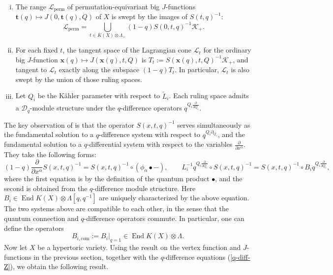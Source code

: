 \documentclass[10pt]{amsart}
\theoremstyle{definition}
\newcommand{\bt}{\mathbf{t}}
\newcommand{\bx}{\mathbf{x}}
\newcommand{\cD}{\mathcal{D}}
\newcommand{\cK}{\mathcal{K}}
\newcommand{\cL}{\mathcal{L}}
\newcommand{\End}{\operatorname{End}}
\newcommand{\com}{\mathrm{com}}
\theoremstyle{definition}
\numberwithin{equation}{section}
\theoremstyle{Theorem}
\begin{document}
\begin{enumerate}[(i)]
	
\setlength{\parskip}{1ex}
	
\item The range $\cL_{\mathrm{perm}}$ of permutation-equivariant big $J$-functions $\bt(q) \mapsto J(0, \bt (q), Q)$ of $X$ is swept by the images of $S(t,q)^{-1}$:
$$
\cL_{\mathrm{perm}} = \bigcup_{t \in K(X) \otimes \Lambda_+} (1-q) S(0, t, q)^{-1} \cK_+.
$$

\item For each fixed $t$, the tangent space of the Lagrangian cone $\cL_t$ for the ordinary big $J$-function $\bx (q) \mapsto J (\bx (q), t, Q)$ is $T_t := S(\bx (q), t, Q)^{-1} \cK_+$, and tangent to $\cL_t$ exactly along the subspace $(1-q) T_t$. In particular, $\cL_t$ is also swept by the union of those ruling spaces.

\item Let $Q_i$ be the K\"ahler parameter with respect to $\widetilde L_i$. Each ruling space admits a $\cD_q$-module structure under the $q$-difference operators $q^{Q_i \frac{\partial}{\partial Q_i}}$.

\end{enumerate}

The key observation of \cite{IMT} is that the operator $S(x, t, q)^{-1}$ serves simultaneously as the fundamental solution to a $q$-difference system with respect to $q^{Q_i \partial_{Q_i}}$, and the fundamental solution to a $q$-differential system with respect to the variables $\frac{\partial}{\partial x^\alpha}$. They take the following forms:
\begin{equation} \label{2-systems}
(1-q) \frac{\partial}{\partial x^\alpha} S(x, t, q)^{-1} = S(x, t, q)^{-1} \circ (\phi_\alpha \bullet - ), \qquad  L_i^{-1} q^{Q_i \frac{\partial}{\partial Q_i}} \circ S(x, t, q)^{-1} = S(x, t, q)^{-1} \circ B_i q^{Q_i \frac{\partial}{\partial Q_i}} ,
\end{equation}
where the first equation is by the definition of the quantum product $\bullet$, and the second is obtained from the $q$-difference module structure. Here $B_i \in \End K(X) \otimes \Lambda [q, q^{-1}]$ are uniquely characterized by the above equation. The two systems above are compatible to each other, in the sense that the quantum connection and $q$-difference operators commute. In particular, one can define the operators
$$
B_{i, \com} := B_i \big|_{q = 1} \in \End K(X) \otimes \Lambda.
$$
Now let $X$ be a hypertoric variety. Using the result on the vertex function and $J$-functions in the previous section, together with the  $q$-difference equations (\ref{q-diff-Z}), we obtain the following result.
\end{document}

